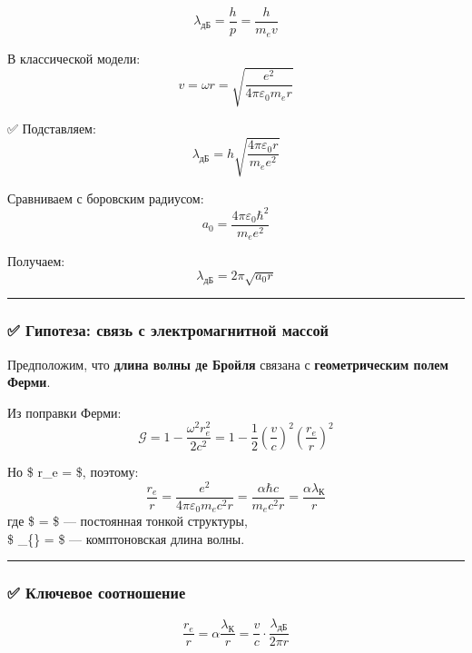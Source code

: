 \documentclass[11pt]{article}
\begin{document}
\[
\lambda_{\text{дБ}} = \frac{h}{p} = \frac{h}{m_e v}
\]

В классической модели: \[
v = \omega r = \sqrt{\frac{e^2}{4\pi\varepsilon_0 m_e r}}
\]

✅ Подставляем: \[
\lambda_{\text{дБ}} = h \sqrt{\frac{4\pi\varepsilon_0 r}{m_e e^2}}
\]

Сравниваем с боровским радиусом: \[
a_0 = \frac{4\pi\varepsilon_0 \hbar^2}{m_e e^2}
\]

Получаем: \[
\lambda_{\text{дБ}} = 2\pi \sqrt{a_0 r}
\]

\begin{center}\rule{0.5\linewidth}{\linethickness}\end{center}

\subsubsection{✅ Гипотеза: связь с электромагнитной
массой}\label{ux433ux438ux43fux43eux442ux435ux437ux430-ux441ux432ux44fux437ux44c-ux441-ux44dux43bux435ux43aux442ux440ux43eux43cux430ux433ux43dux438ux442ux43dux43eux439-ux43cux430ux441ux441ux43eux439}

Предположим, что \textbf{длина волны де Бройля} связана с
\textbf{геометрическим полем Ферми}.

Из поправки Ферми: \[
\mathcal{G} = 1 - \frac{\omega^2 r_e^2}{2c^2} = 1 - \frac{1}{2} \left( \frac{v}{c} \right)^2 \left( \frac{r_e}{r} \right)^2
\]

Но \$ r\_e =  \$, поэтому: \[
\frac{r_e}{r} = \frac{e^2}{4\pi\varepsilon_0 m_e c^2 r} = \frac{\alpha \hbar c}{m_e c^2 r} = \frac{\alpha \lambda_{\text{К}}}{r}
\] где \$ \alpha =  \$ ---
постоянная тонкой структуры,\\
\$ \lambda\_\{\} =  \$ --- комптоновская
длина волны.

\begin{center}\rule{0.5\linewidth}{\linethickness}\end{center}

\subsubsection{✅ Ключевое
соотношение}\label{ux43aux43bux44eux447ux435ux432ux43eux435-ux441ux43eux43eux442ux43dux43eux448ux435ux43dux438ux435}

\[
\frac{r_e}{r} = \alpha \frac{\lambda_{\text{К}}}{r} = \frac{v}{c} \cdot \frac{\lambda_{\text{дБ}}}{2\pi r}
\]
\end{document}
